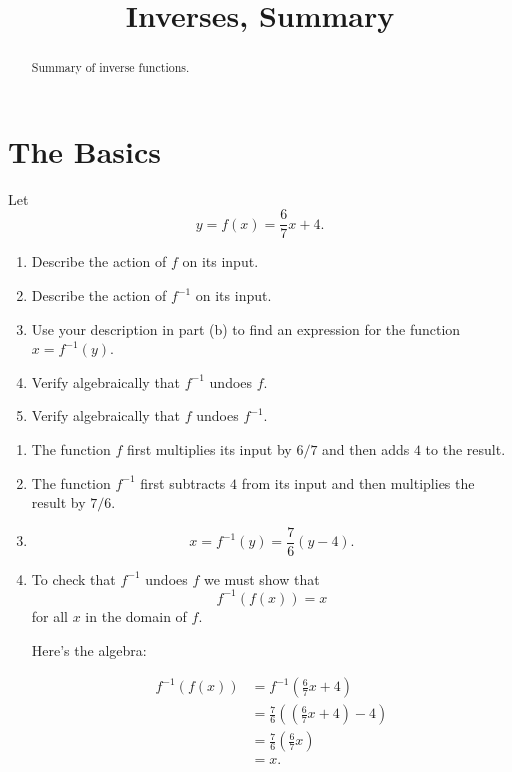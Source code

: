 \documentclass{ximera}
\title{Inverses, Summary}
\begin{document}
\begin{abstract}
Summary of inverse functions.
\end{abstract}
\maketitle

\section{The Basics}

\begin{question}  \label{Qdf3r3fd44xxz}
Let 
\[
     y =f(x) = \frac{6}{7}x + 4.
\]

\begin{enumerate}
\item Describe the action of $f$ on its input.

\item Describe the action of $f^{-1}$ on its input.

\item Use your description in part (b) to find an expression for the function $x=f^{-1}(y)$.

\item Verify algebraically that $f^{-1}$ undoes $f$.

\item Verify algebraically that $f$ undoes $f^{-1}$.
\end{enumerate}

\begin{explanation}
\begin{enumerate}
\item The function $f$ first multiplies its input by $6/7$ and then adds $4$ to the result.

\item The function $f^{-1}$ first subtracts $4$ from its input and then multiplies the result by $7/6$.

\item 
\[
   x = f^{-1}(y) = \frac{7}{6} \left( y - 4\right).
\]

\item To check that $f^{-1}$ undoes $f$ we must show that
\[
     f^{-1}(f(x)) = x
\]
for all $x$ in the domain of $f$.

Here's the algebra:

\begin{align*}
     f^{-1}(f(x)) &= f^{-1}\left( \frac{6}{7}x + 4  \right) \\ 
                       &= \frac{7}{6} \left( \left( \frac{6}{7}x + 4 \right) - 4 \right)  \\
                       &= \frac{7}{6} \left(   \frac{6}{7}x\right) \\
                       &= x.
\end{align*}


\end{enumerate}
\end{explanation}
\end{question}
\end{document}
